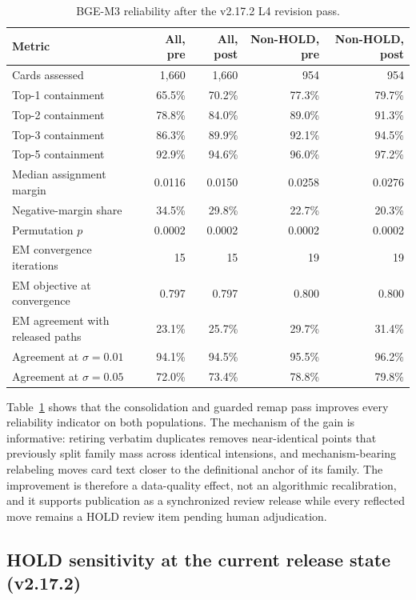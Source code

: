 \documentclass[11pt,a4paper]{article}
\begin{document}
\begin{table}[ht]
\centering
\caption{BGE-M3 reliability after the v2.17.2 L4 revision pass.}
\label{tab:v2172-bge-active}
\begin{tabular}{lrrrr}
\toprule
Metric & All, pre & All, post & Non-HOLD, pre & Non-HOLD, post \\
\midrule
Cards assessed & 1,660 & 1,660 & 954 & 954 \\
Top-1 containment & 65.5\% & 70.2\% & 77.3\% & 79.7\% \\
Top-2 containment & 78.8\% & 84.0\% & 89.0\% & 91.3\% \\
Top-3 containment & 86.3\% & 89.9\% & 92.1\% & 94.5\% \\
Top-5 containment & 92.9\% & 94.6\% & 96.0\% & 97.2\% \\
Median assignment margin & 0.0116 & 0.0150 & 0.0258 & 0.0276 \\
Negative-margin share & 34.5\% & 29.8\% & 22.7\% & 20.3\% \\
Permutation $p$ & 0.0002 & 0.0002 & 0.0002 & 0.0002 \\
EM convergence iterations & 15 & 15 & 19 & 19 \\
EM objective at convergence & 0.797 & 0.797 & 0.800 & 0.800 \\
EM agreement with released paths & 23.1\% & 25.7\% & 29.7\% & 31.4\% \\
Agreement at $\sigma=0.01$ & 94.1\% & 94.5\% & 95.5\% & 96.2\% \\
Agreement at $\sigma=0.05$ & 72.0\% & 73.4\% & 78.8\% & 79.8\% \\
\bottomrule
\end{tabular}
\end{table}

Table~\ref{tab:v2172-bge-active} shows that the consolidation and guarded
remap pass improves every reliability indicator on both populations. The
mechanism of the gain is informative: retiring verbatim duplicates removes
near-identical points that previously split family mass across identical
intensions, and mechanism-bearing relabeling moves card text closer to the
definitional anchor of its family. The improvement is therefore a data-quality
effect, not an algorithmic recalibration, and it supports publication as a
synchronized review release while every reflected move remains a HOLD review
item pending human adjudication.


\subsection{HOLD sensitivity at the current release state (v2.17.2)}
\label{sec:holdsens-current}
\end{document}
